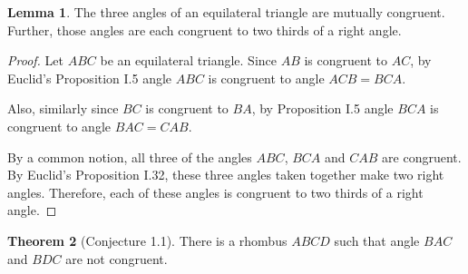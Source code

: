 \documentclass{tufte-handout}
\theoremstyle{definition}
\newtheorem{theorem}{Theorem}[section]
\newtheorem{lemma}[theorem]{Lemma}
\begin{document}
\begin{lemma}\label{lemma:rhombus-equilateral-triangles}
The three angles of an equilateral triangle are mutually congruent. Further, those angles are each congruent to two thirds of a right angle.
\end{lemma}

\begin{proof}
Let $ABC$ be an equilateral triangle. Since $AB$ is congruent to $AC$, by Euclid's Proposition I.5 angle $ABC$ is congruent to angle $ACB = BCA$.

Also, similarly since $BC$ is congruent to $BA$, by Proposition I.5 angle $BCA$ is congruent to angle $BAC = CAB$.

By a common notion, all three of the angles $ABC$, $BCA$ and $CAB$ are congruent. By Euclid's Proposition I.32, these three angles taken together make two right angles. Therefore, each of these angles is congruent to two thirds of a right angle.
\end{proof}

\clearpage

\begin{theorem}[Conjecture 1.1]\label{theorem:rhombus-not-square}
There is a rhombus $ABCD$ such that angle $BAC$ and $BDC$ are not congruent.
\end{theorem}
\end{document}
